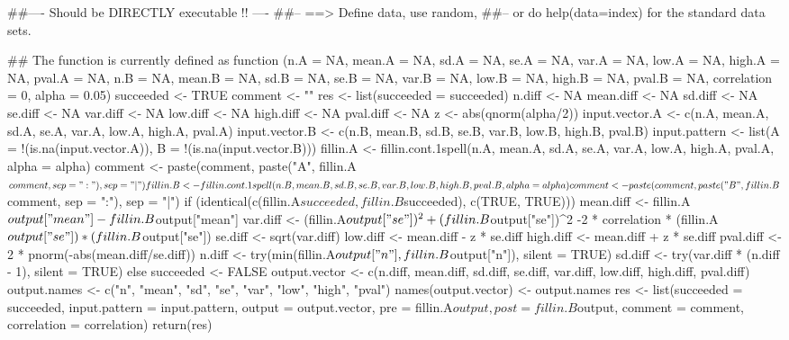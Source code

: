 \begin{Examples}
\begin{ExampleCode}
##---- Should be DIRECTLY executable !! ----
##-- ==>  Define data, use random,
##--    or do  help(data=index)  for the standard data sets.

## The function is currently defined as
function (n.A = NA, mean.A = NA, sd.A = NA, se.A = NA, var.A = NA, 
    low.A = NA, high.A = NA, pval.A = NA, n.B = NA, mean.B = NA, 
    sd.B = NA, se.B = NA, var.B = NA, low.B = NA, high.B = NA, 
    pval.B = NA, correlation = 0, alpha = 0.05) 
{
    succeeded <- TRUE
    comment <- ""
    res <- list(succeeded = succeeded)
    n.diff <- NA
    mean.diff <- NA
    sd.diff <- NA
    se.diff <- NA
    var.diff <- NA
    low.diff <- NA
    high.diff <- NA
    pval.diff <- NA
    z <- abs(qnorm(alpha/2))
    input.vector.A <- c(n.A, mean.A, sd.A, se.A, var.A, low.A, 
        high.A, pval.A)
    input.vector.B <- c(n.B, mean.B, sd.B, se.B, var.B, low.B, 
        high.B, pval.B)
    input.pattern <- list(A = !(is.na(input.vector.A)), B = !(is.na(input.vector.B)))
    fillin.A <- fillin.cont.1spell(n.A, mean.A, sd.A, se.A, var.A, 
        low.A, high.A, pval.A, alpha = alpha)
    comment <- paste(comment, paste("A", fillin.A$comment, sep = ":"), 
        sep = "|")
    fillin.B <- fillin.cont.1spell(n.B, mean.B, sd.B, se.B, var.B, 
        low.B, high.B, pval.B, alpha = alpha)
    comment <- paste(comment, paste("B", fillin.B$comment, sep = ":"), 
        sep = "|")
    if (identical(c(fillin.A$succeeded, fillin.B$succeeded), 
        c(TRUE, TRUE))) {
        mean.diff <- fillin.A$output["mean"] - fillin.B$output["mean"]
        var.diff <- (fillin.A$output["se"])^2 + (fillin.B$output["se"])^2
        -2 * correlation * (fillin.A$output["se"]) * (fillin.B$output["se"])
        se.diff <- sqrt(var.diff)
        low.diff <- mean.diff - z * se.diff
        high.diff <- mean.diff + z * se.diff
        pval.diff <- 2 * pnorm(-abs(mean.diff/se.diff))
        n.diff <- try(min(fillin.A$output["n"], fillin.B$output["n"]), 
            silent = TRUE)
        sd.diff <- try(var.diff * (n.diff - 1), silent = TRUE)
    }
    else {
        succeeded <- FALSE
    }
    output.vector <- c(n.diff, mean.diff, sd.diff, se.diff, var.diff, 
        low.diff, high.diff, pval.diff)
    output.names <- c("n", "mean", "sd", "se", "var", "low", 
        "high", "pval")
    names(output.vector) <- output.names
    res <- list(succeeded = succeeded, input.pattern = input.pattern, 
        output = output.vector, pre = fillin.A$output, post = fillin.B$output, 
        comment = comment, correlation = correlation)
    return(res)
  }
\end{ExampleCode}
\end{Examples}

